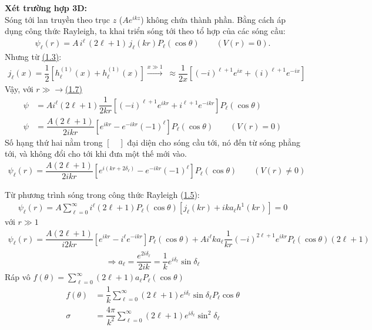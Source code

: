 \documentclass{report}
\renewcommand{\l}{\ell}
\newcommand{\f}[2]{\dfrac{#1}{#2}}
\begin{document}
			\textbf{Xét trường hợp 3D:}\\
			Sóng tới lan truyền theo trục $z$ ($Ae^{ikz}$) không chứa thành phần. Bằng cách áp dụng công thức Rayleigh, ta khai triển sóng tới theo tổ hợp của các sóng cầu:
			\begin{align}
				\psi_{\l}(r) = A\,i^{\l}\,(2\l+1)\,j_{\l} (kr)P_{\l} (\cos\theta) \quad \quad (V(r) = 0).
			\end{align}
			Nhưng từ \hyperref[eq1.3]{(1.3)}:
			\begin{align}
				j_{\l}(x) = \f{1}{2} \left[ h_{\l}^{(1)}(x) + h_{\l}^{(1)}(x)  \right] \overset{x\gg1}{\longrightarrow}\; \approx \f{1}{2x}\left[ (-i)^{\l+1}e^{ix} + (i)^{\l+1}e^{-ix} \right]
			\end{align}\label{eq1.7}
			Vậy, với $r\gg$$\rightarrow$\hyperref[eq1.7]{(1.7)}
		\begin{align}
			\psi & = Ai^{\l} (2\l+1) \f{1}{2kr}\left[(-i)^{\l+1} e^{ikr} +i^{\l+1}e^{-ikr} \right]P_{\l}(\cos\theta)\nonumber \\
			\psi & = \f{A(2\l + 1)}{2ikr}\left[e^{ikr} - e^{-ikr}(-1)^{\l} \right]P_{\l}(\cos\theta) \quad \quad (V(r) = 0)
		\end{align}
		Số hạng thứ hai nằm trong $[\quad]$ đại diện cho sóng cầu tới, nó đến từ sóng phẳng tới, và không đổi cho tới khi đưa một thế mới vào.
		\begin{align}
			\psi_{\l}(r) = \f{A(2\l + 1)}{2ikr}\left[e^{i(kr+2\delta_{\l})} - e^{-ikr}(-1)^{\l} \right]P_{\l}(\cos\theta) \quad \quad (V(r) \neq 0)
		\end{align}

		Từ phương trình sóng trong công thức Rayleigh (\hyperref[eq1.5]{1.5}):
		\begin{align*}
			\psi_{\l}(r) = A\sum_{\l=0}^{\infty}i^{\l}(2\l+1)P_{\l}(\cos\theta)\left[ j_{\l} (kr)+ika_{\l}h^{1}(kr) \right] = 0
		\end{align*}
		với $r\gg1$
		\begin{align*}
			\psi_{\l}(r) = \f{A(2\l+1)}{i2kr}\left[e^{ikr} - i^{\l} e^{-ikr} \right] P_{\l}(\cos\theta) + A i^{\l}ka_{\l}\f{1}{kr}(-i)^{2\l+1}e^{ikr}P_{\l}(\cos\theta)(2\l+1)
		\end{align*}
		\begin{align}
			\Rightarrow a_{\l} = \f{e^{2i\delta_{\l}}}{2ik} = \f{1}{k}e^{i\delta_{\l}}\sin\delta_{\l}
		\end{align}
		Ráp vô $f(\theta)  = \sum_{\l=0}^{\infty}(2\l+1)a_{\l} P_{\l}(\cos\theta)$
		\begin{align}
			f(\theta) & = \f{1}{k} \sum_{\l = 0}^{\infty}(2\l + 1)e^{i\delta_{\l}}\sin\delta_{\l} P_{\l}\cos\theta \\
			\sigma    & = \f{4\pi}{k^2} \sum_{\l = 0}^{\infty}(2\l + 1)e^{i\delta_{\l}}\sin^{2}\delta_{\l}
		\end{align}
\end{document}
